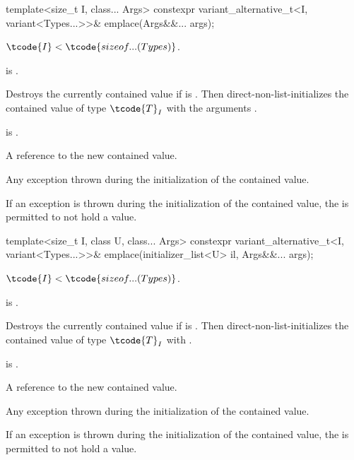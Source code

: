 %
\begin{itemdecl}
template<size_t I, class... Args>
  constexpr variant_alternative_t<I, variant<Types...>>& emplace(Args&&... args);
\end{itemdecl}

\begin{itemdescr}  %
\pnum
\mandates
$\tcode{I} < \tcode{sizeof...(Types)}$.

\pnum
\constraints
{} is .

\pnum
\effects
Destroys the currently contained value if 
is .
Then direct-non-list-initializes the contained value of type $\tcode{T}_I$
with the arguments .

\pnum
\ensures
{} is .

\pnum
\returns
A reference to the new contained value.

\pnum
\throws
Any exception thrown during the initialization of the contained value.

\pnum
\remarks
If an exception is thrown during the initialization of the contained value,
the  is permitted to not hold a value.
\end{itemdescr}

%
\begin{itemdecl}
template<size_t I, class U, class... Args>
  constexpr variant_alternative_t<I, variant<Types...>>&
    emplace(initializer_list<U> il, Args&&... args);
\end{itemdecl}

\begin{itemdescr}  %
\pnum
\mandates
$\tcode{I} < \tcode{sizeof...(Types)}$.

\pnum
\constraints
{} is .

\pnum
\effects
Destroys the currently contained value if 
is .
Then direct-non-list-initializes the contained value of type $\tcode{T}_I$
with .

\pnum
\ensures
{} is .

\pnum
\returns
A reference to the new contained value.

\pnum
\throws
Any exception thrown during the initialization of the contained value.

\pnum
\remarks
If an exception is thrown during the initialization of the contained value,
the  is permitted to not hold a value.
\end{itemdescr}

